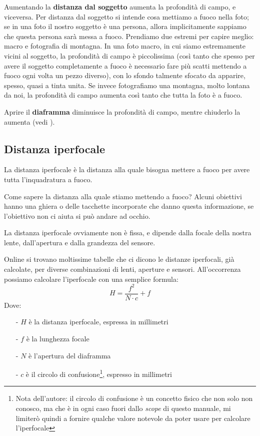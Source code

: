 Aumentando la \textbf{distanza dal soggetto} aumenta la profondità di campo, e viceversa.\newline
Per distanza dal soggetto si intende cosa mettiamo a fuoco nella foto; se in una foto il nostro soggetto è una persona, allora implicitamente sappiamo che questa persona sarà messa a fuoco.
Prendiamo due estremi per capire meglio: macro e fotografia di montagna. In una foto macro, in cui siamo estremamente vicini al soggetto, la profondità di campo è piccolissima (così tanto che spesso per avere il soggetto completamente a fuoco è necessario fare più scatti mettendo a fuoco ogni volta un pezzo diverso), con lo sfondo talmente sfocato da apparire, spesso, quasi a tinta unita. Se invece fotografiamo una montagna, molto lontana da noi, la profondità di campo aumenta così tanto che tutta la foto è a fuoco.

Aprire il \textbf{diaframma} diminuisce la profondità di campo, mentre chiuderlo la aumenta (vedi ).


\subsection{Distanza iperfocale} \label{subsec:iperfocale}
La distanza iperfocale è la distanza alla quale bisogna mettere a fuoco per avere tutta l'inquadratura a fuoco.

Come sapere la distanza alla quale stiamo mettendo a fuoco? Alcuni obiettivi hanno una ghiera o delle tacchette incorporate che danno questa informazione, se l'obiettivo non ci aiuta si può andare ad occhio.

La distanza iperfocale ovviamente non è fissa, e dipende dalla focale della nostra lente, dall'apertura e dalla grandezza del sensore.

Online si trovano moltissime tabelle che ci dicono le distanze iperfocali, già calcolate, per diverse combinazioni di lenti, aperture e sensori. All'occorrenza possiamo calcolare l'iperfocale con una semplice formula:
\[ H = \dfrac{f^2}{N \cdot c} + f \]
Dove:
\begin{itemize}
    \item[-] $H$ è la distanza iperfocale, espressa in millimetri
    \item[-] $f$ è la lunghezza focale
    \item[-] $N$ è l'apertura del diaframma
    \item[-] $c$ è il circolo di confusione\footnote{
        Nota dell'autore: il circolo di confusione è un concetto fisico che non solo non conosco, ma che è in ogni caso fuori dallo \textit{scope} di questo manuale, mi limiterò quindi a fornire qualche valore notevole da poter usare per calcolare l'iperfocale
    }, espresso in millimetri
\end{itemize}

